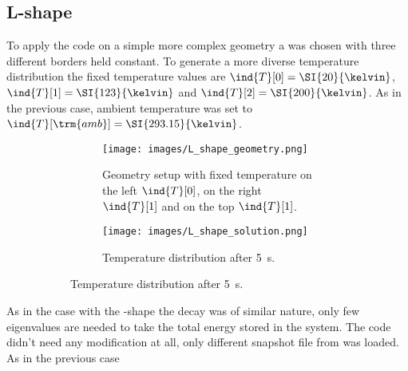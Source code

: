 \documentclass{scrartcl}
\begin{document}
	\subsection{L-shape}
	To apply the code on a simple more complex geometry a  was chosen with three different borders held constant. To generate a more diverse temperature distribution the fixed temperature values are $\ind{T}[0]=\SI{20}{\kelvin}$, $\ind{T}[1]=\SI{123}{\kelvin}$ and $\ind{T}[2]=\SI{200}{\kelvin}$. As in the previous case, ambient temperature was set to $\ind{T}[\trm{amb}]=\SI{293.15}{\kelvin}$.
	\begin{figure}[H]
		\begin{figure}[H]
			\begin{minipage}[t]{0.5\linewidth}
				\begin{subfigure}[t]{\linewidth}
					\texttt{[image: images/L\_shape\_geometry.png]}
					\caption{Geometry setup with fixed temperature on the left $\ind{T}[0]$, on the right $\ind{T}[1]$ and on the top $\ind{T}[1]$.}
				\end{subfigure}
			\end{minipage}
			\begin{minipage}[t]{0.5\linewidth}
				\begin{subfigure}[t]{\linewidth}
					\texttt{[image: images/L\_shape\_solution.png]}
					\caption{Temperature distribution after \SI{5}{\second}.}
				\end{subfigure}
			\end{minipage}
		\end{figure}
		\caption{}
		\label{}
	\end{figure}
	As in the case with the -shape the decay was of similar nature, \ie only few eigenvalues are needed to take the total energy stored in the system. The code didn't need any modification at all, only different snapshot file from \Comsol{} was loaded. As in the previous case 
\end{document}

